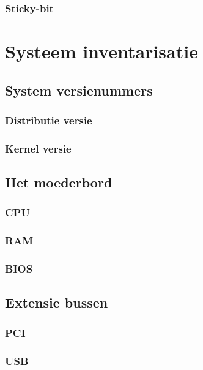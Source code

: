 \documentclass[a4paper,12pt,twoside,openright,titlepage]{book}
\begin{document}
\subsection{Sticky-bit}


\chapter{Systeem inventarisatie}

\section{System versienummers}

\subsection{Distributie versie}

\subsection{Kernel versie}

\section{Het moederbord}
\subsection{CPU}

\subsection{RAM}

\subsection{BIOS}

\section{Extensie bussen}
\subsection{PCI}

\subsection{USB}

\end{document}
